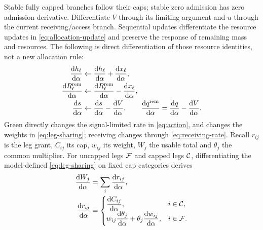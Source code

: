 \documentclass[10pt,a4paper]{article}
\newcommand{\rev}[1]{{\color{revisionred}#1}}
\begin{document}
Stable fully capped branches follow their caps; stable zero admission
has zero admission derivative. Differentiate $V$ through its limiting
argument and $u$ through the current receiving/access branch. Sequential
updates differentiate the resource updates in \eqref{eq:allocation-update}
and preserve the response of remaining mass and resources.
\rev{The following is direct differentiation of those resource identities, not a new allocation rule:}
\begin{equation}
 \begin{aligned}
 \frac{\mathrm dh_\ell}{\mathrm d\alpha}&\leftarrow
  \frac{\mathrm dh_\ell}{\mathrm d\alpha}
                  +\frac{\mathrm dx_\ell}{\mathrm d\alpha},\\
 \frac{\mathrm dR_\ell^{\rm rem}}{\mathrm d\alpha}&\leftarrow
  \frac{\mathrm dR_\ell^{\rm rem}}{\mathrm d\alpha}
                  -\frac{\mathrm dx_\ell}{\mathrm d\alpha},\\
 \frac{\mathrm ds}{\mathrm d\alpha}&\leftarrow
  \frac{\mathrm ds}{\mathrm d\alpha}-\frac{\mathrm dV}{\mathrm d\alpha},
 \qquad
 \frac{\mathrm dq^{\rm rem}}{\mathrm d\alpha}
  =\frac{\mathrm dq}{\mathrm d\alpha}-\frac{\mathrm dV}{\mathrm d\alpha}.
 \end{aligned}
 \label{eq:scan-derivative}
\end{equation}
Green directly changes the signal-limited rate in \eqref{eq:action},
and changes the weights in \eqref{eq:leg-sharing}; receiving changes
through \eqref{eq:receiving-rate}. Recall $r_{ij}$ is the leg grant,
$C_{ij}$ its cap, $w_{ij}$ its weight, $W_j$ the usable total and
$\theta_j$ the common multiplier. For uncapped legs ${\cal F}$ and
capped legs ${\cal C}$,
\rev{differentiating the model-defined \eqref{eq:leg-sharing} on fixed cap categories derives}
\begin{equation}
 \begin{aligned}
 \frac{\mathrm dW_j}{\mathrm d\alpha}
 &=\sum_i\frac{\mathrm dr_{ij}}{\mathrm d\alpha},\\
 \frac{\mathrm dr_{ij}}{\mathrm d\alpha}
 &=\begin{cases}
 \displaystyle\frac{\mathrm dC_{ij}}{\mathrm d\alpha},&i\in{\cal C},\\
 \displaystyle w_{ij}\frac{\mathrm d\theta_j}{\mathrm d\alpha}
       +\theta_j\frac{\mathrm dw_{ij}}{\mathrm d\alpha},&i\in{\cal F}.
 \end{cases}
 \end{aligned}
 \label{eq:sharing-derivative}
\end{equation}
\end{document}

